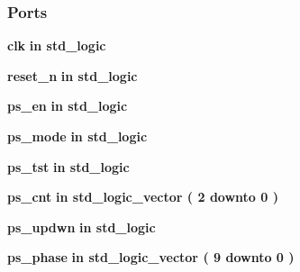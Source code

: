 \subsubsection*{Ports}
 \begin{DoxyCompactItemize}
\item 
{\bf clk}  {\bfseries {\bfseries \textcolor{keywordflow}{in}\textcolor{vhdlchar}{ }}} {\bfseries \textcolor{comment}{std\+\_\+logic}\textcolor{vhdlchar}{ }} 
\item 
{\bf reset\+\_\+n}  {\bfseries {\bfseries \textcolor{keywordflow}{in}\textcolor{vhdlchar}{ }}} {\bfseries \textcolor{comment}{std\+\_\+logic}\textcolor{vhdlchar}{ }} 
\item 
{\bf ps\+\_\+en}  {\bfseries {\bfseries \textcolor{keywordflow}{in}\textcolor{vhdlchar}{ }}} {\bfseries \textcolor{comment}{std\+\_\+logic}\textcolor{vhdlchar}{ }} 
\item 
{\bf ps\+\_\+mode}  {\bfseries {\bfseries \textcolor{keywordflow}{in}\textcolor{vhdlchar}{ }}} {\bfseries \textcolor{comment}{std\+\_\+logic}\textcolor{vhdlchar}{ }} 
\item 
{\bf ps\+\_\+tst}  {\bfseries {\bfseries \textcolor{keywordflow}{in}\textcolor{vhdlchar}{ }}} {\bfseries \textcolor{comment}{std\+\_\+logic}\textcolor{vhdlchar}{ }} 
\item 
{\bf ps\+\_\+cnt}  {\bfseries {\bfseries \textcolor{keywordflow}{in}\textcolor{vhdlchar}{ }}} {\bfseries \textcolor{comment}{std\+\_\+logic\+\_\+vector}\textcolor{vhdlchar}{ }\textcolor{vhdlchar}{(}\textcolor{vhdlchar}{ }\textcolor{vhdlchar}{ } \textcolor{vhdldigit}{2} \textcolor{vhdlchar}{ }\textcolor{keywordflow}{downto}\textcolor{vhdlchar}{ }\textcolor{vhdlchar}{ } \textcolor{vhdldigit}{0} \textcolor{vhdlchar}{ }\textcolor{vhdlchar}{)}\textcolor{vhdlchar}{ }} 
\item 
{\bf ps\+\_\+updwn}  {\bfseries {\bfseries \textcolor{keywordflow}{in}\textcolor{vhdlchar}{ }}} {\bfseries \textcolor{comment}{std\+\_\+logic}\textcolor{vhdlchar}{ }} 
\item 
{\bf ps\+\_\+phase}  {\bfseries {\bfseries \textcolor{keywordflow}{in}\textcolor{vhdlchar}{ }}} {\bfseries \textcolor{comment}{std\+\_\+logic\+\_\+vector}\textcolor{vhdlchar}{ }\textcolor{vhdlchar}{(}\textcolor{vhdlchar}{ }\textcolor{vhdlchar}{ } \textcolor{vhdldigit}{9} \textcolor{vhdlchar}{ }\textcolor{keywordflow}{downto}\textcolor{vhdlchar}{ }\textcolor{vhdlchar}{ } \textcolor{vhdldigit}{0} \textcolor{vhdlchar}{ }\textcolor{vhdlchar}{)}\textcolor{vhdlchar}{ }} 
\item 

\end{DoxyCompactItemize}
